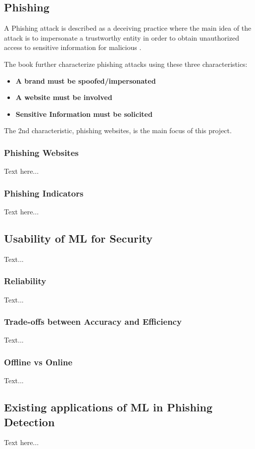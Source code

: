 \documentclass{sigkddExp}
\begin{document}
\subsection{Phishing}
A Phishing attack is described as a deceiving practice where the main idea of the attack is to impersonate a trustworthy entity in order to obtain unauthorized access to sensitive information for malicious \cite{10.5555/1071752.1071800, Ramzan2010}.

\vspace{1em}

The book \cite{Ramzan2010} further characterize phishing attacks using these three characteristics:

\begin{itemize}
	\item \textbf{A brand must be spoofed/impersonated}
	\item \textbf{A website must be involved}
	\item \textbf{Sensitive Information must be solicited}
\end{itemize}

The 2nd characteristic, phishing websites, is the main focus of this project.
\subsubsection{Phishing Websites}
Text here...
\subsubsection{Phishing Indicators}
Text here...
\subsection{Usability of ML for Security}
Text...
\subsubsection{Reliability}
Text...
\subsubsection{Trade-offs between Accuracy and Efficiency}
Text...
\subsubsection{Offline vs Online}
Text...
\subsection{Existing applications of ML in Phishing Detection}
Text here...
\end{document}
